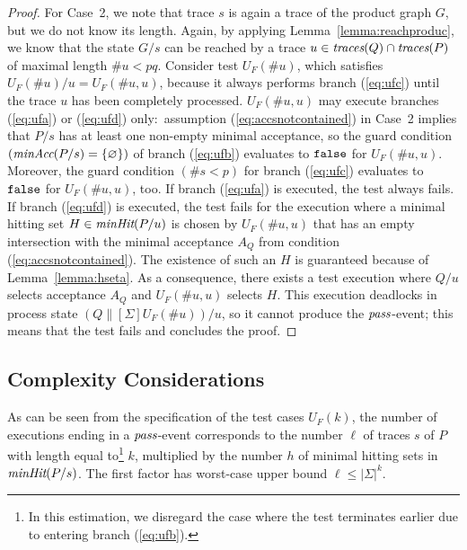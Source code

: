 \begin{proof}
For   Case~2, we note that trace $s$ is again a trace of the product graph
$G$, but we do not know its length. Again, by applying Lemma~\ref{lemma:reachproduc},
we know that the state   $G/s$ can   be reached by a trace
$u\in\text{\it traces}(Q)\cap\text{\it traces}(P)$ of maximal length $\#u < pq$. Consider test $U_F(\#
u)$, which satisfies $U_F(\# u)/u = U_F(\#u,u)$, because it always performs
branch (\ref{eq:ufc}) until the trace $u$ has been completely processed.
$U_F(\#u,u)$ may execute branches (\ref{eq:ufa}) or (\ref{eq:ufd})
only:~assumption (\ref{eq:accsnotcontained}) in Case~2 implies that $P/s$ has
at least one non-empty minimal acceptance, so the guard condition 
$(\text{\it minAcc}(P/s) = \{ \varnothing \})$ 
of branch (\ref{eq:ufb}) evaluates to $\mbox{{\tt false}}$ for $U_F(\#u,u)$.
Moreover, the guard condition $(\#s < p)$ for branch (\ref{eq:ufc}) evaluates
to $\mbox{{\tt false}}$ for $U_F(\#u,u)$, too. If branch (\ref{eq:ufa}) is executed, the
test always fails. If branch (\ref{eq:ufd}) is executed, the test fails for
the execution where a minimal hitting set $H\in\text{\it minHit}(P/u)$ is chosen
by $U_F(\#u,u)$ that has an empty intersection with the minimal acceptance
$A_Q$ from condition (\ref{eq:accsnotcontained}). The existence of such an
$H$ is guaranteed because of Lemma~\ref{lemma:hseta}. As a consequence, there
exists a test execution   where $Q/u$ selects acceptance $A_Q$ and
$U_F(\#u,u)$ selects $H$. This execution deadlocks in process state
$(Q\parallel[\Sigma]U_F(\# u))/u$, so it cannot produce the ${\text{\it pass}}$-event; 
this  means that the test fails and concludes the proof. \xbox
\end{proof}



\subsection{Complexity Considerations}
\label{sec:complexity}

As can be seen from the specification of the test cases $U_F(k)$, the number of 
executions ending in a ${\text{\it pass}}$-event corresponds to the number $\ell$ of traces $s$ 
of $P$ with length equal to\footnote{In this estimation, we disregard 
the case where the test
terminates earlier due to entering branch (\ref{eq:ufb}).} $k$, 
multiplied by the number $h$ of minimal hitting sets in
$\text{\it minHit}(P/s)$. The first factor 
has worst-case upper bound $\ell\le |\Sigma|^k$.



